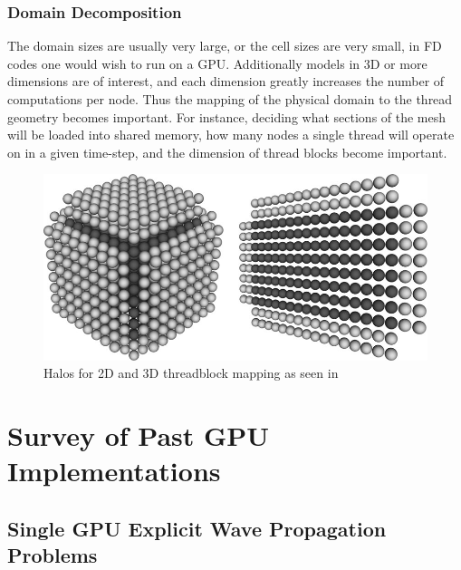 \documentclass[conference]{IEEEtran}
\begin{document}
\subsubsection{Domain Decomposition}

The domain sizes are usually very large, or the cell sizes are very small, in FD codes one would wish to run on a GPU. Additionally models in 3D or more dimensions are of interest, and each dimension greatly increases the number of computations per node. Thus the mapping of the physical domain to the thread geometry becomes important. For instance, deciding what sections of the mesh will be loaded into shared memory, how many nodes a single thread will operate on in a given time-step, and the dimension of thread blocks become important\cite{Michea}.

\begin{figure}[h]
\caption{Halos for 2D and 3D threadblock mapping as seen in \cite{Michea}}
\includegraphics[scale=.25]{halos.png}
\end{figure}
\section{Survey of Past GPU Implementations}

\subsection{Single GPU Explicit Wave Propagation Problems}
\end{document}
